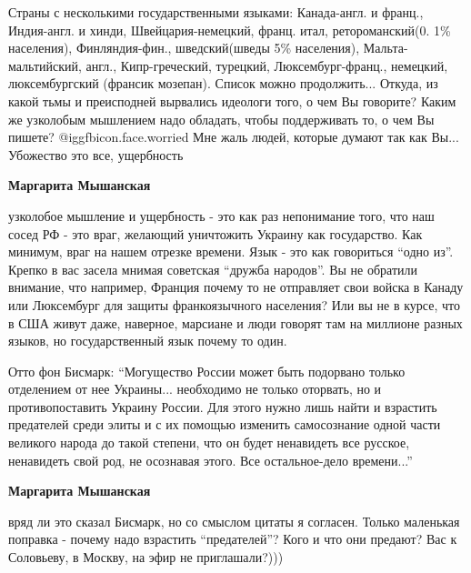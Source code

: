 \begin{itemize}
\begin{itemize}
\begin{itemize}
\end{itemize} %


Страны с несколькими государственными языками: Канада-англ. и франц.,
Индия-англ. и хинди, Швейцария-немецкий, франц. итал, ретороманский(0. 1\%
населения), Финляндия-фин., шведский(шведы 5\% населения), Мальта-мальтийский,
англ., Кипр-греческий, турецкий, Люксембург-франц., немецкий, люксембургский
(франсик мозепан). Список можно продолжить... Откуда, из какой тьмы и
преисподней вырвались идеологи того, о чем Вы говорите? Каким же узколобым
мышлением надо обладать, чтобы поддерживать то, о чем Вы пишете?  @igg{fbicon.face.worried}  Мне жаль
людей, которые думают так как Вы... Убожество это все, ущербность

\begin{itemize} %
\textbf{Маргарита Мышанская} 

узколобое мышление и ущербность - это как раз непонимание того, что наш сосед
РФ - это враг, желающий уничтожить Украину как государство. Как минимум, враг
на нашем отрезке времени. Язык - это как говориться \enquote{одно из}. Крепко в вас
засела мнимая советская \enquote{дружба народов}. Вы не обратили внимание, что
например, Франция почему то не отправляет свои войска в Канаду или Люксембург
для защиты франкоязычного населения? Или вы не в курсе, что в США живут даже,
наверное, марсиане и люди говорят там на миллионе разных языков, но
государственный язык почему то один.

\end{itemize} %


Отто фон Бисмарк: \enquote{Могущество России может быть подорвано только отделением от
нее Украины... необходимо не только оторвать, но и противопоставить Украину
России. Для этого нужно лишь найти и взрастить предателей среди элиты и с их
помощью изменить самосознание одной части великого народа до такой степени, что
он будет ненавидеть все русское, ненавидеть свой род, не осознавая этого. Все
остальное-дело времени...}

\begin{itemize} %
\textbf{Маргарита Мышанская} 

вряд ли это сказал Бисмарк, но со смыслом цитаты я согласен. Только маленькая
поправка - почему надо взрастить \enquote{предателей}? Кого и что они предают?
Вас к Соловьеву, в Москву, на эфир не приглашали?)))


\end{itemize}
\end{itemize}
\end{itemize}

